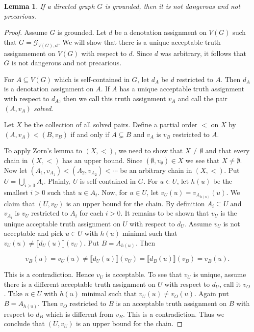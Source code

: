 \documentclass[12pt]{article}
\newtheorem{lem}[thm]{Lemma}
\theoremstyle{remark}
\newcommand{\fancy}[1]{\mathcal{#1}}
\def\G{\fancy{G}}
\begin{document}
\begin{lem}\label{GroundedNotDangerous}
If a directed graph $G$ is grounded, then it is not dangerous and not precarious.
\end{lem}
\begin{proof}
Assume $G$ is grounded.  Let $d$ be a denotation assignment on $V(G)$ such that $G = \G_{V(G), d}$. We will show that there is a unique acceptable truth assignmement on $V(G)$ with respect to $d$.  Since $d$ was arbitrary, it follows that $G$ is not dangerous and not precarious.\newline

For $A \subseteq V(G)$ which is self-contained in $G$, let $d_A$ be $d$ restricted to $A$.  Then $d_A$ is a denotation assignment on $A$.  If $A$ has a unique acceptable truth assignment with respect to $d_A$, then we call this truth assignment $v_A$ and call the pair $(A, v_A)$ \emph{solved}.\newline

Let $X$ be the collection of all solved pairs.  Define a partial order $<$ on $X$ by $(A, v_A) < (B, v_B)$ if and only if $A \subsetneq B$ and $v_A$ is $v_B$ restricted to $A$.\newline

To apply Zorn's lemma to $(X, <)$, we need to show that $X \neq \emptyset$ and that every chain in  $(X, <)$ has an upper bound. Since $(\emptyset, v_\emptyset) \in X$ we see that $X \neq \emptyset$.  Now let $(A_1, v_{A_1}) < (A_2, v_{A_2}) < \cdots$ be an arbitrary chain in $(X, <)$.  Put $U = \bigcup_{i > 0} A_i$. Plainly, $U$ is self-contained in $G$. For $u \in U$, let $h(u)$ be the smallest $i > 0$ such that $u \in A_i$.  Now, for $u \in U$, let $v_U(u) = v_{A_{h(u)}}(u)$.  We claim that $(U, v_U)$ is an upper bound for the chain.  By definition $A_i \subseteq U$ and $v_{A_i}$ is $v_U$ restricted to $A_i$ for each $i > 0$.  It remains to be shown that $v_U$ is the unique acceptable truth assignment on $U$ with respect to $d_U$.  Assume $v_U$ is not acceptable and pick $u \in U$ with $h(u)$ minimal such that $v_U(u) \neq \llbracket d_U(u)\rrbracket(v_U)$.  Put $B = A_{h(u)}$. Then

\[v_B(u) = v_U(u) \neq \llbracket d_U(u)\rrbracket(v_U) = \llbracket d_B(u)\rrbracket(v_B) = v_B(u).\]

This is a contradiction.  Hence $v_U$ is acceptable.  To see that $v_U$ is unique, assume there is a different acceptable truth assignment on $U$ with respect to $d_U$, call it $v_O$.  Take $u \in U$ with $h(u)$ minimal such that $v_U(u) \neq v_O(u)$.  Again put $B = A_{h(u)}$.  Then $v_O$ restricted to $B$ is an acceptable truth assignment on $B$ with respect to $d_B$ which is different from $v_B$.  This is a contradiction.  Thus we conclude that $(U, v_U)$ is an upper bound for the chain.\newline


\end{proof}
\end{document}
